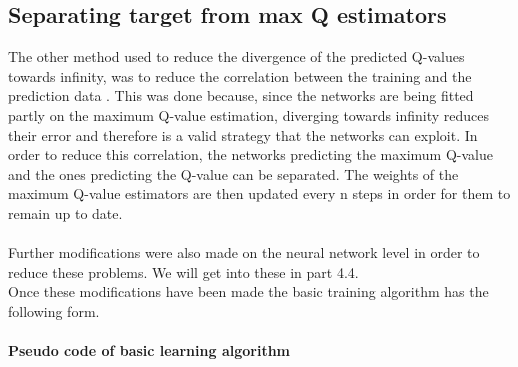 \subsection{Separating target from max Q estimators}
The other method used to reduce the divergence of the predicted Q-values towards infinity, was to reduce the correlation between the training and the prediction data \cite{Mnih2015}. This was done because, since the networks are being fitted partly on the maximum Q-value estimation, diverging towards infinity reduces their error and therefore is a valid strategy that the networks can exploit. In order to reduce this correlation, the networks predicting the maximum Q-value and the ones predicting the Q-value can be separated. The weights of the maximum Q-value estimators are then updated every n steps in order for them to remain up to date.\\
\mbox{}\\
Further modifications were also made on the neural network level in order to reduce these problems. We will get into these in part 4.4.\\
Once these modifications have been made the basic training algorithm has the following form.
\paragraph{Pseudo code of basic learning algorithm}

